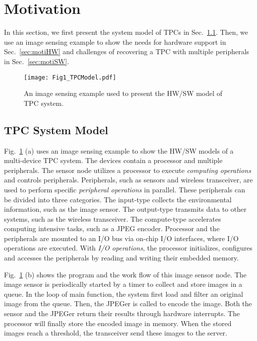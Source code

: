 \section{Motivation} \label{sec:motivation}
%
In this section, we first present the system model of TPCs in Sec.~\ref{sec:motiModel}. 
Then, we use an image sensing example to show the needs for hardware support in Sec.~\ref{sec:motiHW} and challenges of recovering a TPC with multiple peripherals in Sec.~\ref{sec:motiSW}. 

%
\begin{figure}[t]
    \centering
    \texttt{[image: Fig1\_TPCModel.pdf]}
    \caption{An image sensing example used to present the HW/SW model of TPC system.}
    \label{fig:TPCmodel}
\end{figure}

\subsection{TPC System Model} \label{sec:motiModel}
%
Fig.~\ref{fig:TPCmodel} (a) uses an image sensing example to show the HW/SW models of a multi-device TPC system.
The devices contain a processor and multiple peripherals.
The sensor node utilizes a processor to execute \emph{computing operations} and controls peripherals.
Peripherals, such as sensors and wireless transceiver, are used to perform specific \emph{peripheral operations} in parallel. 
These peripherals can be divided into three categories.
The input-type collects the environmental information, such as the image sensor.
The output-type transmits data to other systems, such as the wireless transceiver.
The compute-type accelerates computing intensive tasks, such as a JPEG encoder.
Processor and the peripherals are mounted to an I/O bus via on-chip I/O interfaces, where I/O operations are executed.
With \emph{I/O operations}, the processor initializes, configures and accesses the peripherals by reading and writing their embedded memory. 

Fig.~\ref{fig:TPCmodel} (b) shows the program and the work flow of this image sensor node.
The image sensor is periodically started by a timer to collect and store images in a queue.
In the loop of main function, the system first load and filter an original image from the queue.
Then, the JPEGer is called to encode the image.
Both the sensor and the JPEGer return their results through hardware interrupts.
The processor will finally store the encoded image in memory.
When the stored images reach a threshold, the transceiver send these images to the server.


